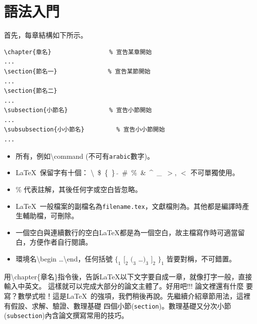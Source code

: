 \chapter{\protect 語法入門}
首先，每章結構如下所示。

\begin{Verbatim}[frame=single,firstline=1,label=Every chapter]
\chapter{章名}   　　　　　　　　% 宣告某章開始
...
\section{節名一}　　　　　　　　 % 宣告某節開始
...
\section{節名二}
...
\subsection{小節名}　　　　　　　% 宣告小節開始
...
\subsubsection{小小節名}         % 宣告小小節開始
...
\end{Verbatim}

\begin{itemize}
\item 所有，例如\textbackslash command (不可有{\tt arabic}數字)。
\item \LaTeX\ 保留字有十個： \textbackslash\  \$\ \{\ \}\ $\tilde{}$\ \#\ \%\ \&\ \textasciicircum\
 \_\ $>$, $<$ 不可單獨使用。  
\item \% 代表註解，其後任何字或空白皆忽略。
\item \LaTeX\ 一般檔案的副檔名為{\tt filename.tex}，文獻檔則為。其他都是編譯時產生輔助檔，可刪除。
\item 一個空白與連續數行的空白\LaTeX{}都是為一個空白，故主檔寫作時可適當留白，方便作者自行閱讀。
\item 環境名\textbackslash begin \ldots \textbackslash end，任何括號 $\{_1$ $[_2$ $(_{3}$ \ldots $)_3$ $]_2$ $\}_1$ 皆要對稱，不可錯置。
\end{itemize}
用{\textbackslash chapter\{章名\}}指令後，告訴\LaTeX{}以下文字要自成一章，就像打字一般，直接輸入中英文。
這樣就可以完成大部分的論文主體了。好用吧!!! 論文裡還有什麼
要寫？數學式啦！這是\LaTeX\ 的強項，我們稍後再說。先繼續介紹章節用法，這裡有假設、求解、驗證、數理基礎 四個小節({\tt section})。數理基礎又分次小節({\tt subsection})內含論文撰寫常用的技巧。


